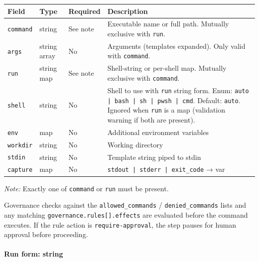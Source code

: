 \begin{center}
\begin{tabular}{lllp{5.2cm}}
\hline
\textbf{Field}   & \textbf{Type}            & \textbf{Required} & \textbf{Description} \\
\hline
\texttt{command} & string                   & See note & Executable name or full path.
                                                         Mutually exclusive with \texttt{run}. \\
\texttt{args}    & string array             & No       & Arguments (templates expanded).
                                                         Only valid with \texttt{command}. \\
\texttt{run}     & string \textbar{} map    & See note & Shell-string or per-shell map.
                                                         Mutually exclusive with \texttt{command}. \\
\texttt{shell}   & string                   & No       & Shell to use with \texttt{run} string form.
                                                         Enum: \texttt{auto | bash | sh | pwsh | cmd}.
                                                         Default: \texttt{auto}.
                                                         Ignored when \texttt{run} is a map
                                                         (validation warning if both are present). \\
\texttt{env}     & map                      & No       & Additional environment variables \\
\texttt{workdir} & string                   & No       & Working directory \\
\texttt{stdin}   & string                   & No       & Template string piped to stdin \\
\texttt{capture} & map                      & No       & \texttt{stdout | stderr | exit\_code} → var \\
\hline
\end{tabular}
\end{center}

\textit{Note:} Exactly one of \texttt{command} or \texttt{run} must be present.

Governance checks against the \texttt{allowed\_commands} / \texttt{denied\_commands}
lists and any matching \texttt{governance.rules[].effects} are evaluated
before the command executes.  If the rule action is \texttt{require-approval},
the step pauses for human approval before proceeding.

\paragraph{Run form: string}

